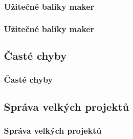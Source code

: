 \subsubsection{Užitečné balíky maker}
\begin{frame}
	\frametitle{Užitečné balíky maker}
	\UnderConstruction
\end{frame}


\subsection{Časté chyby}
\begin{frame}
	\frametitle{Časté chyby}
	\UnderConstruction
\end{frame}


\subsection{Správa velkých projektů}
\begin{frame}
	\frametitle{Správa velkých projektů}
	\UnderConstruction
\end{frame}

\endinput